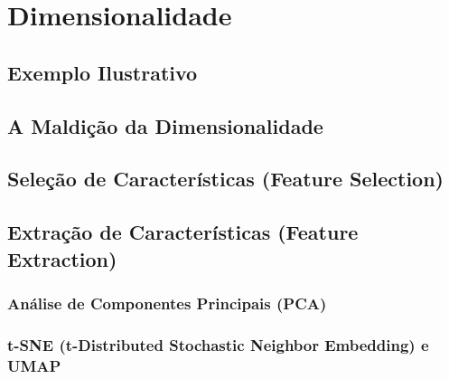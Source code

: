 
\chapter{Dimensionalidade}
\label{cap:dimensionalidade}

\section{Exemplo Ilustrativo}

\section{A Maldição da Dimensionalidade}

\section{Seleção de Características (Feature Selection)}

\section{Extração de Características (Feature Extraction)}

\subsection{Análise de Componentes Principais (PCA)} 

\subsection{t-SNE (t-Distributed Stochastic Neighbor Embedding) e UMAP}